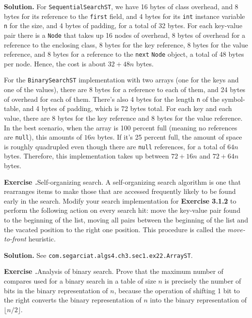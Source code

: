 \documentclass[12pt, a4paper]{article}
\newenvironment{ex}[2][Exercise]
{\par\medskip\noindent \textbf{#1 #2.}}
{\medskip}
\newenvironment{sol}[1][Solution]
{\par\medskip\noindent \textbf{#1.} }
{\medskip}
\begin{document}
	\begin{sol}
		For \texttt{SequentialSearchST}, we have 16 bytes of class overhead, and 8 bytes
		for its reference to the  \texttt{first} field, and 4 bytes for its \texttt{int}
		instance variable \texttt{n} for the size, and 4 bytes of padding, for a total
		of 32 bytes. For each key-value pair there is a \texttt{Node} that takes up 16
		nodes of overhead, 8 bytes of overhead for a reference to the enclosing class,
		8 bytes for the key reference, 8 bytes for the value reference, and 8 bytes for a
		reference to the \texttt{next} \texttt{Node} object, a total of 48 bytes per node.
		Hence, the cost is about $32+48n$ bytes.
		
		For the \texttt{BinarySearchST} implementation with two arrays (one for the keys
		and one of the values), there are 8 bytes for a reference to each of them,
		and 24 bytes of overhead for each of them. There's also 4 bytes for the length
		\texttt{n} of the symbol-table, and 4 bytes
		of padding, which is 72 bytes total. For each key and each value, there are
		8 bytes for the key reference and 8 bytes for the value reference. In the
		best scenario, when the array is 100 percent full (meaning no references
		are \texttt{null}), this amounts of $16n$ bytes. If it's 25 percent full,
		the amount of space is roughly quadrupled even though there are \texttt{null}
		references, for a total of $64n$ bytes. Therefore, this implementation takes
		up between $72+16n$ and $72+64n$ bytes.
	\end{sol}
	\begin{ex}{22}
		\emph{Self-organizing search}. A self-organizing search algorithm is one that
		rearranges items to make those that are accessed frequently likely to be found
		early in the search. Modify your search implementation for \textbf{Exercise 3.1.2}
		to perform the following action on every search hit: move the key-value pair
		found to the beginning of the list, moving all pairs between the beginning of the
		list and the vacated position to the right one position. This procedure is called
		the \emph{move-to-front} heuristic.
	\end{ex}
	\begin{sol}
		See \texttt{com.segarciat.algs4.ch3.sec1.ex22.ArrayST}.
	\end{sol}
	\begin{ex}{23}
		\emph{Analysis of binary search}. Prove that the maximum number of compares used
		for a binary search in a table of size $n$ is precisely the number of bits in
		the binary representation of $n$, because the operation of shifting 1 bit to the
		right converts the binary representation of $n$ into the binary representation
		of $\lfloor n / 2\rfloor$.
	\end{ex}
\end{document}
